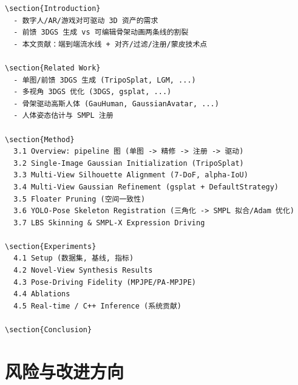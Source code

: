 \documentclass[11pt]{article}
\begin{document}
\begin{lstlisting}[basicstyle=\ttfamily\small, frame=single, breaklines=true]
\section{Introduction}
  - 数字人/AR/游戏对可驱动 3D 资产的需求
  - 前馈 3DGS 生成 vs 可编辑骨架动画两条线的割裂
  - 本文贡献：端到端流水线 + 对齐/过滤/注册/蒙皮技术点

\section{Related Work}
  - 单图/前馈 3DGS 生成 (TripoSplat, LGM, ...)
  - 多视角 3DGS 优化 (3DGS, gsplat, ...)
  - 骨架驱动高斯人体 (GauHuman, GaussianAvatar, ...)
  - 人体姿态估计与 SMPL 注册

\section{Method}
  3.1 Overview: pipeline 图 (单图 -> 精修 -> 注册 -> 驱动)
  3.2 Single-Image Gaussian Initialization (TripoSplat)
  3.3 Multi-View Silhouette Alignment (7-DoF, alpha-IoU)
  3.4 Multi-View Gaussian Refinement (gsplat + DefaultStrategy)
  3.5 Floater Pruning (空间一致性)
  3.6 YOLO-Pose Skeleton Registration (三角化 -> SMPL 拟合/Adam 优化)
  3.7 LBS Skinning & SMPL-X Expression Driving

\section{Experiments}
  4.1 Setup (数据集, 基线, 指标)
  4.2 Novel-View Synthesis Results
  4.3 Pose-Driving Fidelity (MPJPE/PA-MPJPE)
  4.4 Ablations
  4.5 Real-time / C++ Inference (系统贡献)

\section{Conclusion}
\end{lstlisting}

\section{风险与改进方向}
\end{document}
